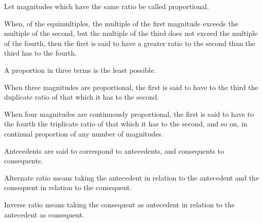 \begin{scope}
\label{def:V.6}
Let magnitudes which have the same ratio be called proportional.
\end{scope}

\begin{scope}
\label{def:V.7}
When, of the equimultiples, the multiple of the first magnitude
exceeds the multiple of the second, but the multiple of the third
does not exceed the multiple of the fourth, then the first is said
to have a greater ratio to the second than the third has to the fourth.
\end{scope}

\begin{scope}
\label{def:V.8}
A proportion in three terms is the least possible.
\end{scope}

\begin{scope}
\label{def:V.9}
When three magnitudes are proportional, the first is said to have to
the third the duplicate ratio of that which it has to the second.
\end{scope}

\begin{scope}
\label{def:V.10}
When four magnitudes are continuously proportional, the first is said
to have to the fourth the triplicate ratio of that which it has to
the second, and so on, in continual proportion of any number of
magnitudes.
\end{scope}

\begin{scope}
\label{def:V.11}
Antecedents are said to correspond to antecedents, and consequents to
consequents.
\end{scope}

\begin{scope}
\label{def:V.12}
Alternate ratio means taking the antecedent in relation to the
antecedent and the consequent in relation to the consequent.
\end{scope}

\begin{scope}
\label{def:V.13}
Inverse ratio means taking the consequent as antecedent in relation
to the antecedent as consequent.
\end{scope}


